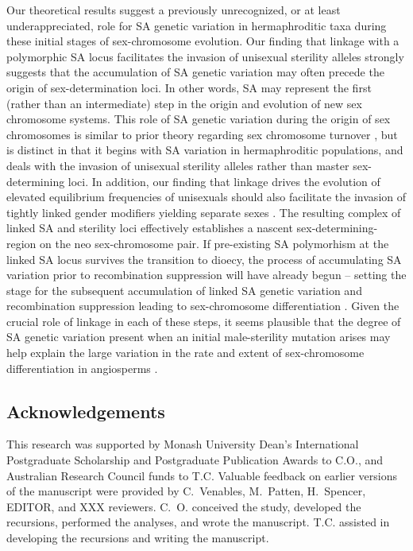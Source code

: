 \documentclass{article}
\begin{document}
Our theoretical results suggest a previously unrecognized, or at least underappreciated, role for SA genetic variation in hermaphroditic taxa during these initial stages of sex-chromosome evolution. Our finding that linkage with a polymorphic SA locus facilitates the invasion of unisexual sterility alleles strongly suggests that the accumulation of SA genetic variation may often precede the origin of sex-determination loci. In other words, SA may represent the first (rather than an intermediate) step in the origin and evolution of new sex chromosome systems. This role of SA genetic variation during the origin of sex chromosomes is similar to prior theory regarding sex chromosome turnover \citep{vanDoornKirkpatrick2007,vanDoornKirkpatrick2010}, but is distinct in that it begins with SA variation in hermaphroditic populations, and deals with the invasion of unisexual sterility alleles rather than master sex-determining loci. In addition, our finding that linkage drives the evolution of elevated equilibrium frequencies of unisexuals should also facilitate the invasion of tightly linked gender modifiers yielding separate sexes \citep{Charlesworth1978a}. The resulting complex of linked SA and sterility loci effectively establishes a nascent sex-determining-region on the neo sex-chromosome pair. If pre-existing SA polymorhism at the linked SA locus survives the transition to dioecy, the process of accumulating SA variation prior to recombination suppression will have already begun -- setting the stage for the subsequent accumulation of linked SA genetic variation and recombination suppression leading to sex-chromosome differentiation \citep{Charlesworth1978a,Rice1987,Bachtrog2006,Qiuetal2013}. Given the crucial role of linkage in each of these steps, it seems plausible that the degree of SA genetic variation present when an initial male-sterility mutation arises may help explain the large variation in the rate and extent of sex-chromosome differentiation in angiosperms \citep{Charlesworth2002,Renner2014,Bachtrog2014}.


\subsection*{Acknowledgements}
This research was supported by Monash University Dean's International Postgraduate Scholarship and Postgraduate Publication Awards to C.O., and Australian Research Council funds to T.C. Valuable feedback on earlier versions of the manuscript were provided by C.~Venables, M.~Patten, H.~Spencer, EDITOR, and XXX reviewers. C.~O. conceived the study, developed the recursions, performed the analyses, and wrote the manuscript. T.C. assisted in developing the recursions and writing the manuscript.
\end{document}

